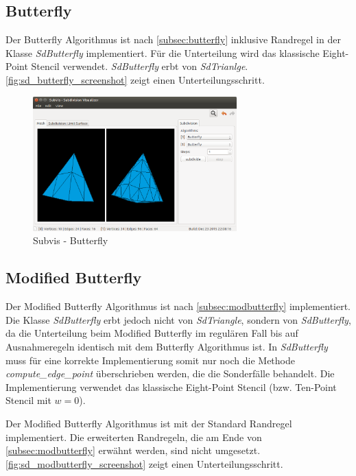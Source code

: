 \subsection{Butterfly}

Der Butterfly Algorithmus ist nach \autoref{subsec:butterfly}
inklusive Randregel in der Klasse \emph{SdButterfly} implementiert.
Für die Unterteilung wird das klassische Eight-Point Stencil verwendet.
\emph{SdButterfly} erbt von \emph{SdTrianlge}.
\autoref{fig:sd_butterfly_screenshot} zeigt einen Unterteilungsschritt.

\begin{figure}
  \centering
  \includegraphics[width=0.7\textwidth]{content/media/sd_butterfly_screenshot.png}
  \caption{Subvis - Butterfly}
  \label{fig:sd_butterfly_screenshot}
\end{figure}

\subsection{Modified Butterfly}

Der Modified Butterfly Algorithmus ist nach \autoref{subsec:modbutterfly} implementiert.
Die Klasse \emph{SdButterfly} erbt jedoch nicht von \emph{SdTriangle},
sondern von \emph{SdButterfly}, da die Unterteilung
beim Modified Butterfly im regulären Fall bis auf Ausnahmeregeln
identisch mit dem Butterfly Algorithmus ist. In \emph{SdButterfly}
muss für eine korrekte Implementierung somit nur noch die Methode
\emph{compute\_edge\_point} überschrieben werden, die
die Sonderfälle behandelt.
Die Implementierung verwendet das klassische Eight-Point Stencil
(bzw. Ten-Point Stencil mit \(w = 0\)).

Der Modified Butterfly Algorithmus ist mit der Standard Randregel
implementiert.
Die erweiterten Randregeln, die am Ende von \autoref{subsec:modbutterfly}
erwähnt werden, sind nicht umgesetzt.
\autoref{fig:sd_modbutterfly_screenshot} zeigt einen Unterteilungsschritt.

